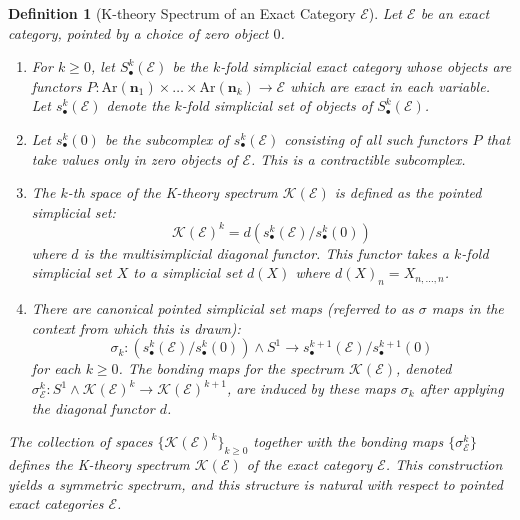 \documentclass[12pt]{report}
\numberwithin{equation}{section}
\newtheorem{definition}[dummy]{Definition}
\begin{document}
	\begin{definition}[K-theory Spectrum of an Exact Category \(\mathcal{E}\)]
		Let $\mathcal{E}$ be an exact category, pointed by a choice of zero object $0$.
		\begin{enumerate}
			\item For $k \ge 0$, let $S_{\bullet}^k(\mathcal{E})$ be the $k$-fold simplicial exact category whose objects are functors $P: \mathrm{Ar}(\mathbf{n}_1) \times \dots \times \mathrm{Ar}(\mathbf{n}_k) \to \mathcal{E}$ which are exact in each variable. Let $s_{\bullet}^k(\mathcal{E})$ denote the $k$-fold simplicial set of objects of $S_{\bullet}^k(\mathcal{E})$.
			
			\item Let $s_{\bullet}^k(0)$ be the subcomplex of $s_{\bullet}^k(\mathcal{E})$ consisting of all such functors $P$ that take values only in zero objects of $\mathcal{E}$. This is a contractible subcomplex.
			
			\item The {$k$-th space of the K-theory spectrum} $\mathcal{K}(\mathcal{E})$ is defined as the pointed simplicial set:
			\[ \mathcal{K}(\mathcal{E})^k = d\left(s_{\bullet}^k(\mathcal{E}) / s_{\bullet}^k(0)\right) \]
			where $d$ is the multisimplicial diagonal functor. This functor takes a $k$-fold simplicial set $X$ to a simplicial set $d(X)$ where $d(X)_n = X_{n,\dots,n}$.
			
			\item There are canonical pointed simplicial set maps (referred to as $\sigma$ maps in the context from which this is drawn):
			\[ \sigma_k : \left(s_{\bullet}^k(\mathcal{E})/s_{\bullet}^k(0)\right) \wedge S^1 \to s_{\bullet}^{k+1}(\mathcal{E})/s_{\bullet}^{k+1}(0) \]
			for each $k \ge 0$. The {bonding maps} for the spectrum $\mathcal{K}(\mathcal{E})$, denoted $\sigma_{\mathcal{E}}^k : S^1 \wedge \mathcal{K}(\mathcal{E})^k \to \mathcal{K}(\mathcal{E})^{k+1}$, are induced by these maps $\sigma_k$ after applying the diagonal functor $d$.
		\end{enumerate}
		The collection of spaces $\{\mathcal{K}(\mathcal{E})^k\}_{k \ge 0}$ together with the bonding maps $\{\sigma_{\mathcal{E}}^k\}$ defines the K-theory spectrum $\mathcal{K}(\mathcal{E})$ of the exact category $\mathcal{E}$. This construction yields a symmetric spectrum, and this structure is natural with respect to pointed exact categories $\mathcal{E}$.
	\end{definition}
	
\end{document}

